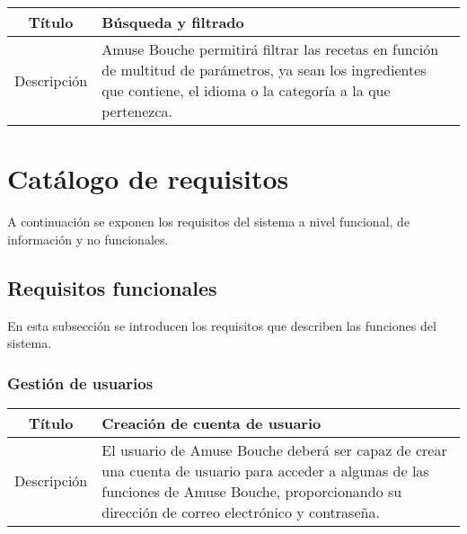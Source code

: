 \begin{center}
  
  \begin{tabularx}{\textwidth}{|c|X|}
    \hline
    Título & Búsqueda y filtrado \\

    \hline

    Descripción & Amuse Bouche permitirá filtrar las recetas en función de
    multitud de parámetros, ya sean los ingredientes que contiene, el idioma o
    la categoría a la que pertenezca.\\

    \hline
  \end{tabularx}
\end{center}

\section{Catálogo de requisitos}

A continuación se exponen los requisitos del sistema a nivel funcional, de
información y no funcionales.

\subsection{Requisitos funcionales}

En esta subsección se introducen los requisitos que describen las funciones del
sistema.

\subsubsection{Gestión de usuarios}

\begin{center}
  
  \begin{tabularx}{\textwidth}{|c|X|}
    \hline
    Título & Creación de cuenta de usuario \\

    \hline

    Descripción & El usuario de Amuse Bouche deberá ser capaz de crear una
    cuenta de usuario para acceder a algunas de las funciones de Amuse Bouche,
    proporcionando su dirección de correo electrónico y contraseña.\\

    \hline
  \end{tabularx}
\end{center}


